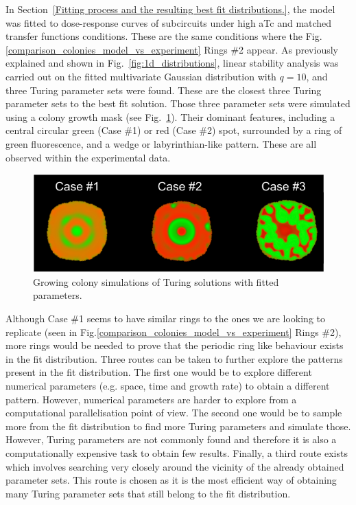 In Section~\ref{Fitting process and the resulting best fit distributions.}, the model was fitted to dose-response curves of subcircuits under high aTc and matched transfer functions conditions.
These are the same conditions where the Fig.\ref{comparison_colonies_model_vs_experiment} Rings \#2 appear.
As previously explained and shown in Fig.~\ref{fig:1d_distributions}, linear stability analysis was carried out on the fitted multivariate Gaussian distribution with $q=10$, and three Turing parameter sets were found.
These are the closest three Turing parameter sets to the best fit solution.
Those three parameter sets were simulated using a colony growth mask (see Fig.~\ref{best_fit_colony_turing}). %
Their dominant features, including a central circular green (Case \#1) or red (Case \#2) spot, surrounded by a ring of green fluorescence, and a wedge or labyrinthian-like pattern.
These are all observed within the experimental data. %

\begin{figure}[H]
    \centering

    \includegraphics[width=1\textwidth]{chapters/Chapter 3/best_fit_colony_turing}
    \caption{Growing colony simulations of Turing solutions with fitted parameters.}
    \label{best_fit_colony_turing}
\end{figure} %

Although Case \#1 seems to have similar rings to the ones we are looking to replicate (seen in Fig.\ref{comparison_colonies_model_vs_experiment} Rings \#2), more rings would be needed to prove that the periodic ring like behaviour exists in the fit distribution.
Three routes can be taken to further explore the patterns present in the fit distribution.
The first one would be to explore different numerical parameters (e.g. space, time and growth rate) to obtain a different pattern.
However, numerical parameters are harder to explore from a computational parallelisation point of view.
The second one would be to sample more from the fit distribution to find more Turing parameters and simulate those.
However, Turing parameters are not commonly found and therefore it is also a computationally expensive task to obtain few results.
Finally, a third route exists which involves searching very closely around the vicinity of the already obtained parameter sets.
This route is chosen as it is the most efficient way of obtaining many Turing parameter sets that still belong to the fit distribution.

